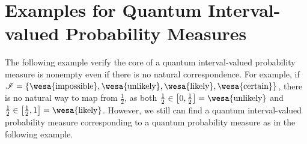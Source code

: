 \documentclass{article}
\theoremstyle{remark}
\newcommand{\imposs}{{\mbox{\wesa{impossible}}}}
\newcommand{\likely}{{\mbox{\wesa{likely}}}}
\newcommand{\unlikely}{{\mbox{\wesa{unlikely}}}}
\newcommand{\necess}{{\mbox{\wesa{certain}}}}
\begin{document}

\begin{comment}


\end{comment}

\printbibliography

\appendix

\section{Examples for Quantum Interval-valued Probability Measures}

The following example verify the core of a quantum interval-valued
probability measure is nonempty even if there is no natural correspondence.
For example, if $\mathscr{I}=\left\{ \imposs,\unlikely,\likely,\necess\right\} $,
there is no natural way to map from $\frac{1}{2}$, as both $\frac{1}{2}\in\left[0,\frac{1}{2}\right]=\unlikely$
and $\frac{1}{2}\in\left[\frac{1}{2},1\right]=\likely$. However,
we still can find a quantum interval-valued probability measure corresponding
to a quantum probability measure as in the following example.
\end{document}
